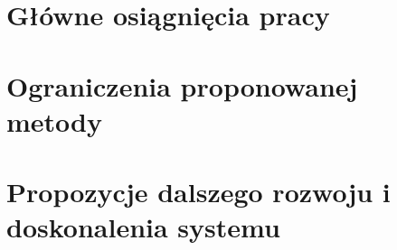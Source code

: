 \section{Główne osiągnięcia pracy}
\section{Ograniczenia proponowanej metody}
\section{Propozycje dalszego rozwoju i doskonalenia systemu}